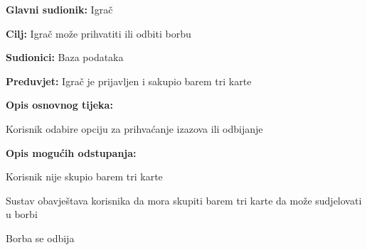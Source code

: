 					\noindent {}
					\begin{packed_item}
						
						\item \textbf{Glavni sudionik: }Igrač
						\item  \textbf{Cilj:} Igrač može prihvatiti ili odbiti borbu
						\item  \textbf{Sudionici:} Baza podataka
						\item  \textbf{Preduvjet:} Igrač je prijavljen i sakupio barem tri karte
						\item  \textbf{Opis osnovnog tijeka:}
						
						\item[] \begin{packed_enum}
							
							\item Korisnik odabire opciju za prihvaćanje izazova ili odbijanje
						\end{packed_enum}
						
						\item  \textbf{Opis mogućih odstupanja:}
						
						\item[] \begin{packed_item}
							
							\item[2.a] Korisnik nije skupio barem tri karte
							\item[] \begin{packed_enum}
								
								\item Sustav obavještava korisnika da mora skupiti barem tri karte da može sudjelovati u borbi
								\item Borba se odbija
								
							\end{packed_enum}
						\end{packed_item}
					\end{packed_item}
					
